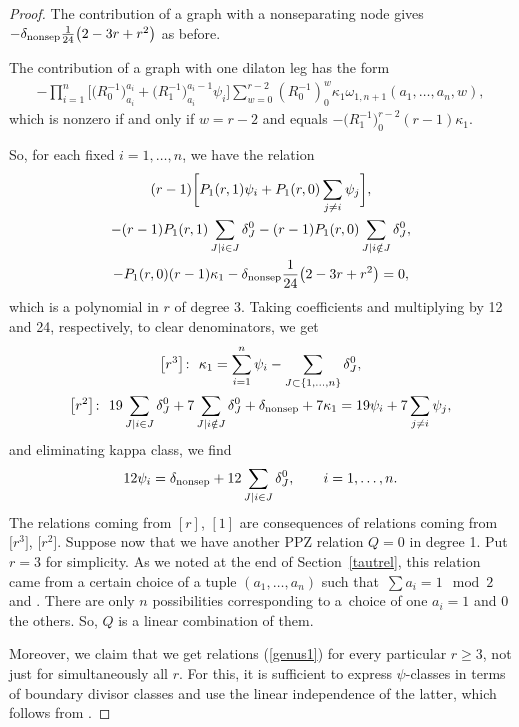\documentclass[10pt,a4paper]{amsart}
\numberwithin{equation}{section}
\begin{document}
\begin{proof}
The contribution of a graph with a nonseparating node
 gives $ -\delta_{\rm nonsep}\frac{1}{24}\big(2-3r+r^2\big)$ as before.

The contribution of a graph with one dilaton leg has the form
\begin{align*}
-\prod^{n}_{i=1}\big[\big(R^{-1}_{0}\big)^{a_i}_{a_i}+\big(R^{-1}_{1}\big)^{a_i-1}_{a_i}\psi_i\big]\sum^{r-2}_{w=0}(R^{-1}_{0})^{w}_{0}\kappa_1 \omega_{1,n+1}(a_1,\dots,a_n,w),
\end{align*}
which is nonzero if and only if $w = r-2$ and equals $-\big(R^{-1}_{1}\big)^{r-2}_{0}(r-1)\kappa_1$.

So, for each fixed $i = 1,\dots,n$, we have the relation
\begin{gather*}
(r-1)\bigg[P_1(r,1)\psi_i +P_1(r,0) \sum_{j\neq i}\psi_j\bigg],\\
-(r-1)P_1(r,1)\sum_{J| i \in J} \delta^{0}_{J} -(r-1)P_1(r,0)\sum_{J| i \notin J} \delta^{0}_{J},\\
-P_1(r,0)(r-1)\kappa_1 -\delta_{\rm nonsep}\dfrac{1}{24}\big(2-3r+r^2\big) = 0,
\end{gather*}
which is a polynomial in $r$ of degree $3$. Taking coefficients and multiplying by 12 and 24, respectively, to clear denominators, we get
\begin{gather*}
\big[r^3\big]\colon\ \kappa_1 = \sum^{n}_{i=1}\psi_i - \sum_{J\subset \{1,\dots,n\}}\delta^{0}_{J},\\
\big[r^2\big]\colon\ 19\sum_{J| i \in J}\delta^{0}_{J} + 7\sum_{J| i \notin J}\delta^{0}_{J} + \delta_{\rm nonsep} + 7\kappa_1 = 19\psi_i + 7\sum_{j\neq i}\psi_j,
\end{gather*}
and eliminating kappa class, we find
\begin{gather*}
12\psi_i = \delta_{\rm nonsep} + 12\sum_{J|i\in J} \delta^{0}_{J}, \qquad
 i=1,\dots,n.
\end{gather*}
The relations coming from $[r]$, $[1]$ are consequences of relations coming from $\big[r^3\big]$, $\big[r^2\big]$.
Suppose now that we have another PPZ relation $Q=0$ in degree 1. Put $r=3$ for simplicity. As we noted at the end of Section~\ref{tautrel}, this relation came from a certain choice of a tuple $(a_1,\dots, a_n)$ such that~${\sum a_i = 1 \mod 2}$ and . There are only $n$ possibilities corresponding to a~choice of one $a_i=1$ and 0 the others. So, $Q$ is a linear combination of them.

Moreover, we claim that we get relations (\ref{genus1}) for every particular $r\geq3$, not just for simultaneously all $r$. For this, it is sufficient to express $\psi$-classes in terms of boundary divisor classes and use the linear independence of the latter, which follows from \cite[Theorem 2.2]{Cor}.


\end{proof}
\end{document}
